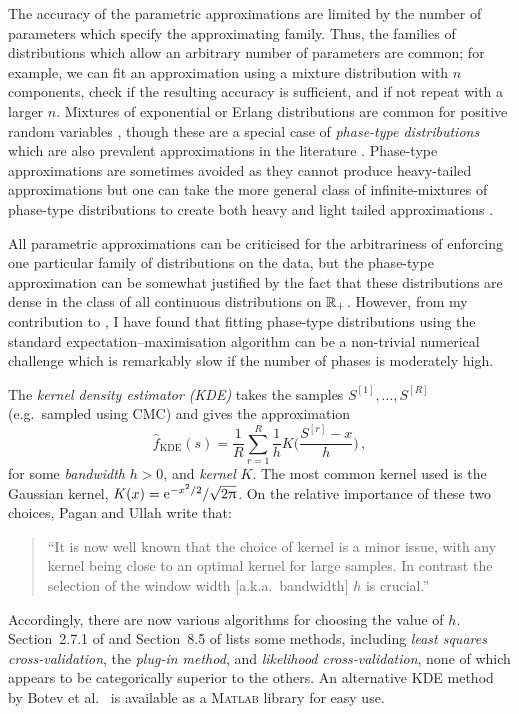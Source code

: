 The accuracy of the parametric approximations are limited by the number of parameters which specify the approximating family. Thus, the families of distributions which allow an arbitrary number of parameters are common; for example, we can fit an approximation using a mixture distribution with $n$ components, check if the resulting accuracy is sufficient, and if not repeat with a larger $n$. Mixtures of exponential or Erlang distributions are common for positive random variables \cite{WiWo07,LeLi10,WiLi11}, though these are a special case of \emph{phase-type distributions} which are also prevalent approximations in the literature \cite{bladt2005review,hassan2009actuarial,hassan2014use,APQ,asmussen2010ruin}. Phase-type approximations are sometimes avoided as they cannot produce heavy-tailed approximations \cite{embrechts2009panjer} but one can take the more general class of infinite-mixtures of phase-type distributions to create both heavy and light tailed approximations \cite{rojas2017asymptotic,yao2016estimating}.

All parametric approximations can be criticised for the arbitrariness of enforcing one particular family of distributions on the data, but the phase-type approximation can be somewhat justified by the fact that these distributions are dense in the class of all continuous distributions on $\mathbb{R}_+$. However, from my contribution to \cite{asmussen2018phase}, I have found that fitting phase-type distributions using the standard expectation--maximisation algorithm \cite{asmussen1996fitting,olsson1996estimation} can be a non-trivial numerical challenge which is remarkably slow if the number of phases is moderately high.

The \emph{kernel density estimator (KDE)} \cite{wand1994kernel} takes the samples $S^{[1]}, \dots, S^{[R]}$ (e.g.\ sampled using CMC) and gives the approximation
\[ \hat{f}_{\mathrm{KDE}}(s) = \frac{1}{R} \sum_{r=1}^{R} \frac{1}{h} K\bigl(\frac{S^{[r]} - x}{h}\bigr) \,, \]
for some \emph{bandwidth} $h > 0$, and \emph{kernel} $K$. The most common kernel used is the Gaussian kernel, $K(x) = \mathrm{e}^{-x^2/2}/\sqrt{2\uppi}$. On the relative importance of these two choices, Pagan and Ullah \cite[p.\ 19]{pagan1999nonparametric} write that:
\begin{quote}
	``It is now well known that the choice of kernel is a minor issue, with any kernel being close to an optimal kernel for large samples. In contrast the selection of the window width [a.k.a.\ bandwidth] $h$ is crucial.''
\end{quote}
Accordingly, there are now various algorithms for choosing the value of $h$. Section~2.7.1 of \cite{pagan1999nonparametric} and Section~8.5 of \cite{kroese2013handbook} lists some methods, including \emph{least squares cross-validation}, the \emph{plug-in method}, and \emph{likelihood cross-validation}, none of which appears to be categorically superior to the others. An alternative KDE method by Botev et al.\ \cite{botev2010kernel} is available as a \textsc{Matlab} library for easy use.



